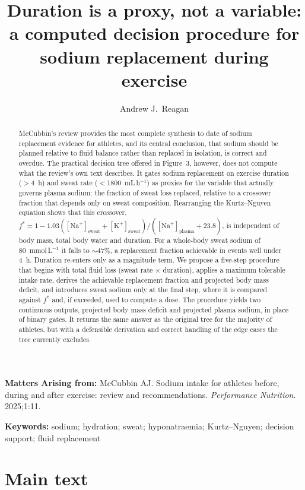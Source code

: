 \documentclass[11pt,a4paper]{article}
\title{Duration is a proxy, not a variable: a computed decision procedure for sodium replacement during exercise}
\author[1,2]{Andrew J.\ Reagan}
\affil[1]{Data Science, MassMutual, Springfield, MA, USA}
\affil[2]{University of California, Berkeley, CA, USA}
\affil[ ]{Corresponding author: \href{mailto:andrew.j.reagan@berkeley.edu}{andrew.j.reagan@berkeley.edu}}
\date{}
\newcommand{\Na}{[\mathrm{Na}^{+}]}
\newcommand{\K}{[\mathrm{K}^{+}]}
\newcommand{\mmolL}{mmol\,L$^{-1}$}
\newcommand{\fstar}{f^{*}}
\begin{document}
\maketitle

\noindent\textbf{Matters Arising from:} McCubbin AJ. Sodium intake for athletes before, during and after exercise: review and recommendations. \textit{Performance Nutrition}. 2025;1:11.

\begin{abstract}
\noindent McCubbin's review provides the most complete synthesis to date of sodium replacement evidence for athletes, and its central conclusion, that sodium should be planned relative to fluid balance rather than replaced in isolation, is correct and overdue. The practical decision tree offered in Figure~3, however, does not compute what the review's own text describes. It gates sodium replacement on exercise duration ($>$4~h) and sweat rate ($<$1800~mL\,h$^{-1}$) as proxies for the variable that actually governs plasma sodium: the fraction of sweat loss replaced, relative to a crossover fraction that depends only on sweat composition. Rearranging the Kurtz--Nguyen equation shows that this crossover, $\fstar = 1 - 1.03(\Na_{\mathrm{sweat}} + \K_{\mathrm{sweat}})/(\Na_{\mathrm{plasma}} + 23.8)$, is independent of body mass, total body water and duration. For a whole-body sweat sodium of 80~\mmolL{} it falls to ${\sim}47\%$, a replacement fraction achievable in events well under 4~h. Duration re-enters only as a magnitude term. We propose a five-step procedure that begins with total fluid loss (sweat rate $\times$ duration), applies a maximum tolerable intake rate, derives the achievable replacement fraction and projected body mass deficit, and introduces sweat sodium only at the final step, where it is compared against $\fstar$ and, if exceeded, used to compute a dose. The procedure yields two continuous outputs, projected body mass deficit and projected plasma sodium, in place of binary gates. It returns the same answer as the original tree for the majority of athletes, but with a defensible derivation and correct handling of the edge cases the tree currently excludes.
\end{abstract}

\noindent\textbf{Keywords:} sodium; hydration; sweat; hyponatraemia; Kurtz--Nguyen; decision support; fluid replacement

\section*{Main text}
\end{document}
